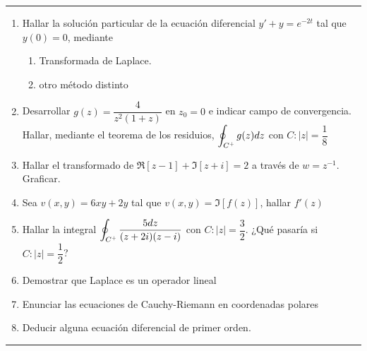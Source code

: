 \documentclass[9pt,a4paper]{extarticle}
\newcommand{\plus}{\scalebox{0.6}{$+$}}
\begin{document}
\newpage
\hrule

\begin{enumerate}
\item Hallar la solución particular de la ecuación diferencial $y' +y=e^{-2t}$ tal que $y(0)=0$, mediante
\begin{enumerate}
    \item Transformada de Laplace.
    \item otro método distinto
\end{enumerate}

\item Desarrollar $g(z)=\dfrac{4}{z^2(1+z)}$ en $z_0 =0$ e indicar campo de convergencia. Hallar, mediante el teorema de los residuios, $\displaystyle \oint_{C^{\plus}} g(z)dz$ con $C: |z|=\dfrac{1}{8}$

\item Hallar el transformado de $\Re[z-1]+\Im[z+i]=2$ a través de $w=z^{-1}$. Graficar.

\item Sea $v(x,y)=6xy+2y$ tal que $v(x,y)=\Im[f(z)]$, hallar $f'(z)$

\item Hallar la integral $\displaystyle \oint_{C^{\plus}} \dfrac{5dz}{(z+2i)(z-i)}$ con $C: |z|=\dfrac{3}{2}$. ¿Qué pasaría si $C: |z|=\dfrac{1}{2}$?

\item Demostrar que Laplace es un operador lineal

\item Enunciar las ecuaciones de Cauchy-Riemann en coordenadas polares

\item Deducir alguna ecuación diferencial de primer orden.

\end{enumerate}
\hrule
\end{document}
